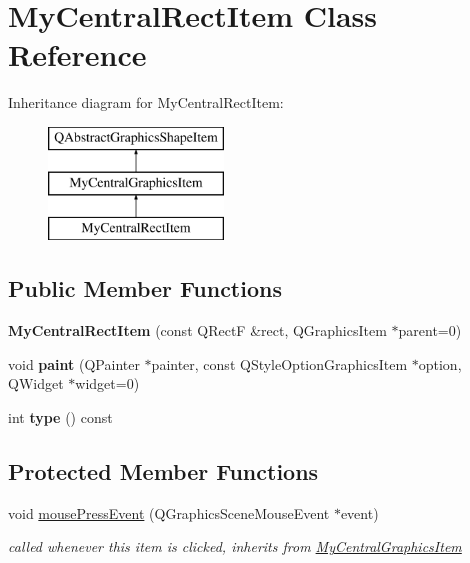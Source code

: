 \hypertarget{class_my_central_rect_item}{}\section{My\+Central\+Rect\+Item Class Reference}
\label{class_my_central_rect_item}
Inheritance diagram for My\+Central\+Rect\+Item\+:\begin{figure}[H]
\begin{center}
\leavevmode
\includegraphics[height=3.000000cm]{class_my_central_rect_item}
\end{center}
\end{figure}
\subsection*{Public Member Functions}
\begin{DoxyCompactItemize}
\item 
\hypertarget{class_my_central_rect_item_a7edf24741fb0098e78dea7079d2983f3}{}{\bfseries My\+Central\+Rect\+Item} (const Q\+Rect\+F \&rect, Q\+Graphics\+Item $\ast$parent=0)\label{class_my_central_rect_item_a7edf24741fb0098e78dea7079d2983f3}

\item 
\hypertarget{class_my_central_rect_item_a87c70071f69fb8fc4142af545447f326}{}void {\bfseries paint} (Q\+Painter $\ast$painter, const Q\+Style\+Option\+Graphics\+Item $\ast$option, Q\+Widget $\ast$widget=0)\label{class_my_central_rect_item_a87c70071f69fb8fc4142af545447f326}

\item 
\hypertarget{class_my_central_rect_item_a4b970e08db43fd6b8f18dce8114458c2}{}int {\bfseries type} () const \label{class_my_central_rect_item_a4b970e08db43fd6b8f18dce8114458c2}

\end{DoxyCompactItemize}
\subsection*{Protected Member Functions}
\begin{DoxyCompactItemize}
\item 
\hypertarget{class_my_central_rect_item_ac6ed556955ad6f3c2643311e3de22f7a}{}void \hyperlink{class_my_central_rect_item_ac6ed556955ad6f3c2643311e3de22f7a}{mouse\+Press\+Event} (Q\+Graphics\+Scene\+Mouse\+Event $\ast$event)\label{class_my_central_rect_item_ac6ed556955ad6f3c2643311e3de22f7a}

\begin{DoxyCompactList}\small\item\em called whenever this item is clicked, inherits from \hyperlink{class_my_central_graphics_item}{My\+Central\+Graphics\+Item} \end{DoxyCompactList}\end{DoxyCompactItemize}
